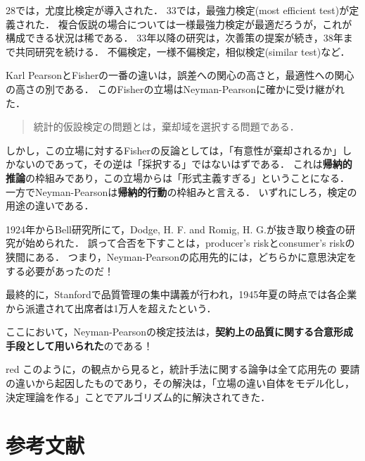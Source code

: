 \documentclass[uplatex,dvipdfmx]{jsreport}
\begin{document}
\begin{history}
    28\cite{NeymanPearson28}では，尤度比検定が導入された．
    33\cite{NeymanPearson33}では，最強力検定(most efficient test)が定義された．
    複合仮説の場合については一様最強力検定が最適だろうが，これが構成できる状況は稀である．
    33年以降の研究は，次善策の提案が続き，38年まで共同研究を続ける．
    不偏検定，一様不偏検定，相似検定(similar test)など．

    Karl PearsonとFisherの一番の違いは，誤差への関心の高さと，最適性への関心の高さの別である．
    このFisherの立場はNeyman-Pearsonに確かに受け継がれた．
    \begin{quote}
        統計的仮設検定の問題とは，棄却域を選択する問題である．
    \end{quote}
    しかし，この立場に対するFisherの反論としては，「有意性が棄却されるか」しかないのであって，その逆は「採択する」ではないはずである．
    これは\textbf{帰納的推論}の枠組みであり，この立場からは「形式主義すぎる」ということになる．
    一方でNeyman-Pearsonは\textbf{帰納的行動}の枠組みと言える．
    いずれにしろ，検定の用途の違いである．
\end{history}

\begin{context}
    1924年からBell研究所にて，Dodge, H. F. and Romig, H. G.が抜き取り検査の研究が始められた．
    誤って合否を下すことは，producer's riskとconsumer's riskの狭間にある．
    つまり，Neyman-Pearsonの応用先的には，どちらかに意思決定をする必要があったのだ！

    最終的に，Stanfordで品質管理の集中講義が行われ，1945年夏の時点では各企業から派遣されて出席者は1万人を超えたという．
    
    ここにおいて，Neyman-Pearsonの検定技法は，\textbf{契約上の品質に関する合意形成手段として用いられた}のである！
\end{context}

\begin{tbox}{red}{}
    このように，\cite{Fisher}の観点から見ると，統計手法に関する論争は全て応用先の
    要請の違いから起因したものであり，その解決は，「立場の違い自体をモデル化し，決定理論を作る」ことでアルゴリズム的に解決されてきた．

\end{tbox}

\chapter{参考文献}
\end{document}
